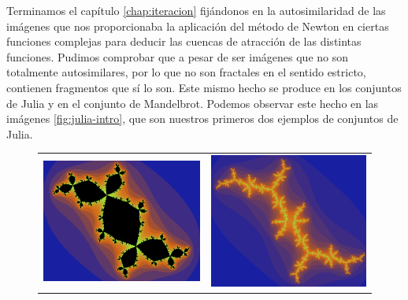 %
%

Terminamos el capítulo \ref{chap:iteracion} fijándonos en la autosimilaridad de las imágenes que nos proporcionaba la aplicación del método de Newton en ciertas funciones complejas para deducir las cuencas de atracción de las distintas funciones. Pudimos comprobar que a pesar de ser imágenes que no son totalmente autosimilares, por lo que no son fractales en el sentido estricto, contienen fragmentos que sí lo son. Este mismo hecho se produce en los conjuntos de Julia y en el conjunto de Mandelbrot. Podemos observar este hecho en las imágenes \ref{fig:julia-intro}, que son nuestros primeros dos ejemplos de conjuntos de Julia.

\begin{figure}[ht]
    \centering
    \begin{tabular}{cc}
      \includegraphics[scale=0.28]{./img/C3/julia-intro-2.png} &   \includegraphics[scale=0.255]{./img/C3/julia-intro-1.png} \\

\end{tabular}
\end{figure}
